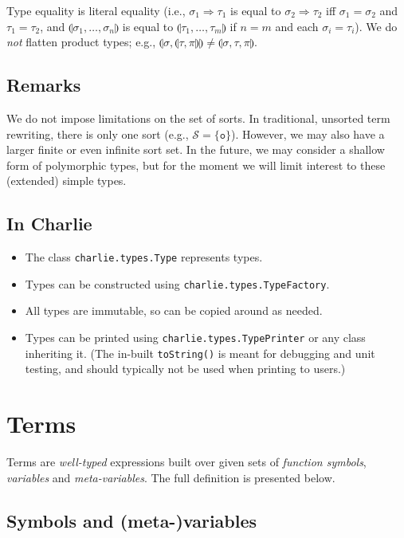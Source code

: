\documentclass{lmcs}
\theoremstyle{theorem}\newtheorem{theorem}{Theorem}
\theoremstyle{theorem}\newtheorem{lemma}[theorem]{Lemma}
\theoremstyle{theorem}\newtheorem{corollary}[theorem]{Corollary}
\theoremstyle{definition}\newtheorem{definition}[theorem]{Definition}
\theoremstyle{definition}\newtheorem{example}[theorem]{Example}
\newcommand{\Sorts}{\mathcal{S}}
\newcommand{\atype}{\sigma}
\newcommand{\btype}{\tau}
\newcommand{\ctype}{\pi}
\newcommand{\product}[2]{\llparenthesis #1,\dots,#2 \rrparenthesis}
\newcommand{\pair}[2]{\llparenthesis #1,#2 \rrparenthesis}
\newcommand{\triple}[3]{\llparenthesis #1,#2,#3 \rrparenthesis}
\newcommand{\arrtype}{\Rightarrow}
\newcommand{\unitsort}{\mathtt{o}}
\newcommand{\charlie}{\textsf{Charlie}\xspace}
\begin{document}
\bigskip
Type equality is literal equality (i.e., $\atype_1 \arrtype \btype_1$ is equal
to $\atype_2 \arrtype \btype_2$ iff $\atype_1 = \atype_2$ and $\btype_1 =
\btype_2$, and $\product{\atype_1}{\atype_n}$ is equal to
$\product{\btype_1}{\btype_m}$ if $n = m$ and each $\atype_i = \btype_i$).
We do \emph{not} flatten product types; e.g.,
$\pair{\atype}{\pair{\btype}{\ctype}} \neq \triple{\atype}{\btype}{\ctype}$.

\subsection*{Remarks}

We do not impose limitations on the set of sorts.  In traditional, unsorted term
rewriting, there is only one sort (e.g., $\Sorts = \{ \unitsort \}$). However,
we may also have a larger finite or even infinite sort set.
In the future, we may consider a shallow form of polymorphic types, but for the
moment we will limit interest to these (extended) simple types.

\subsection*{In \charlie}

\begin{itemize}
\item The class \texttt{charlie.types.Type} represents types.
\item Types can be constructed using \texttt{charlie.types.TypeFactory}.
\item All types are immutable, so can be copied around as needed.
\item Types can be printed using \texttt{charlie.types.TypePrinter} or any class
  inheriting it.
  (The in-built \texttt{toString()} is meant for debugging and unit testing, and
  should typically not be used when printing to users.)
\end{itemize}

\section{Terms}

Terms are \emph{well-typed} expressions built over given sets of \emph{function
symbols}, \emph{variables} and \emph{meta-variables}. The full definition is
presented below.

\subsection{Symbols and (meta-)variables}
\end{document}
